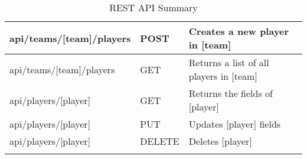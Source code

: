 \begin{longtable}{|p{}|p{} |p{}|}
api/teams/[team]/players & POST & Creates a new player in [team]\\ \hline
api/teams/[team]/players & GET &  Returns a list of all players in [team]\\ \hline
api/players/[player] & GET &  Returns the fields of [player]\\ \hline
api/players/[player] & PUT &  Updates [player] fields\\ \hline
api/players/[player] & DELETE &  Deletes [player]\\ \hline
\caption{REST API Summary}
\label{tab:termGlossary}
\end{longtable}
\newpage
